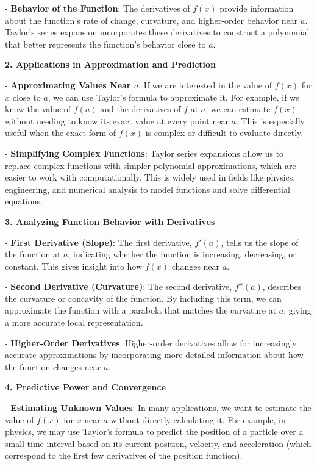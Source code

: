 \documentclass[a4paper,12pt]{book}
\begin{document}
- \textbf{Behavior of the Function}: The derivatives of \( f(x) \) provide information about the function’s rate of change, curvature, and higher-order behavior near \( a \). Taylor’s series expansion incorporates these derivatives to construct a polynomial that better represents the function’s behavior close to \( a \).

\textbf{2. Applications in Approximation and Prediction}

- \textbf{Approximating Values Near \( a \)}: If we are interested in the value of \( f(x) \) for \( x \) close to \( a \), we can use Taylor’s formula to approximate it. For example, if we know the value of \( f(a) \) and the derivatives of \( f \) at \( a \), we can estimate \( f(x) \) without needing to know its exact value at every point near \( a \). This is especially useful when the exact form of \( f(x) \) is complex or difficult to evaluate directly.

- \textbf{Simplifying Complex Functions}: Taylor series expansions allow us to replace complex functions with simpler polynomial approximations, which are easier to work with computationally. This is widely used in fields like physics, engineering, and numerical analysis to model functions and solve differential equations.

\textbf{3. Analyzing Function Behavior with Derivatives}

- \textbf{First Derivative (Slope)}: The first derivative, \( f'(a) \), tells us the slope of the function at \( a \), indicating whether the function is increasing, decreasing, or constant. This gives insight into how \( f(x) \) changes near \( a \).

- \textbf{Second Derivative (Curvature)}: The second derivative, \( f''(a) \), describes the curvature or concavity of the function. By including this term, we can approximate the function with a parabola that matches the curvature at \( a \), giving a more accurate local representation.

- \textbf{Higher-Order Derivatives}: Higher-order derivatives allow for increasingly accurate approximations by incorporating more detailed information about how the function changes near \( a \).

\textbf{4. Predictive Power and Convergence}

- \textbf{Estimating Unknown Values}: In many applications, we want to estimate the value of \( f(x) \) for \( x \) near \( a \) without directly calculating it. For example, in physics, we may use Taylor’s formula to predict the position of a particle over a small time interval based on its current position, velocity, and acceleration (which correspond to the first few derivatives of the position function).
\end{document}
